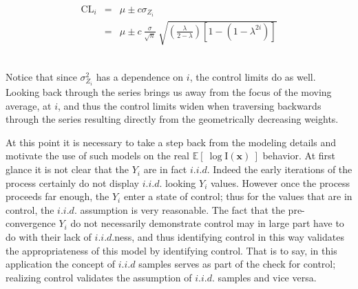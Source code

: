 \documentclass[12pt]{article}
\newcommand{\E}[1]{
        \mathbb{E}\left[~#1~\right]
}
\def \ix {
	\text{I}(\bm{x})
}
\begin{document}
	\begin{eqnarray}
	\text{CL}_i &=& \mu \pm c \sigma_{Z_i}\nonumber\\
	&=&  \mu \pm c ~ \frac{\sigma}{\sqrt{n}}~\sqrt{\left(\frac{\lambda}{2-\lambda}\right)\left[1-(1-\lambda^{2i})\right]}
	\label{EWMACL}
	\end{eqnarray}
	
	$~$\\\\
	Notice that since $\sigma^2_{Z_i}$ has a dependence on $i$, the control limits do as well.
	Looking back through the series brings us away from the focus of the moving average, at $i$, and thus the control limits widen when traversing backwards through the series resulting directly from the geometrically decreasing weights.  
	
	
	At this point it is necessary to take a step back from the modeling details and motivate the use of such models on the real $\E{\log\ix}$ behavior.
	At first glance it is not clear that the $Y_i$ are in fact $i.i.d$. %
	Indeed the early iterations of the process certainly do not display $i.i.d.$ looking $Y_i$ values.
	However once the process proceeds far enough, the $Y_i$ enter a state of control; thus for the values that are in control, the $i.i.d.$ assumption is very reasonable.
	The fact that the pre-convergence $Y_i$ do not necessarily demonstrate control may in large part have to do with their lack of $i.i.d.$ness, and thus identifying control in this way validates the appropriateness of this model by identifying control. %
	That is to say, in this application the concept of $i.i.d$ samples serves as part of the check for control; realizing control validates the assumption of $i.i.d.$ samples and vice versa.
	
\end{document}
